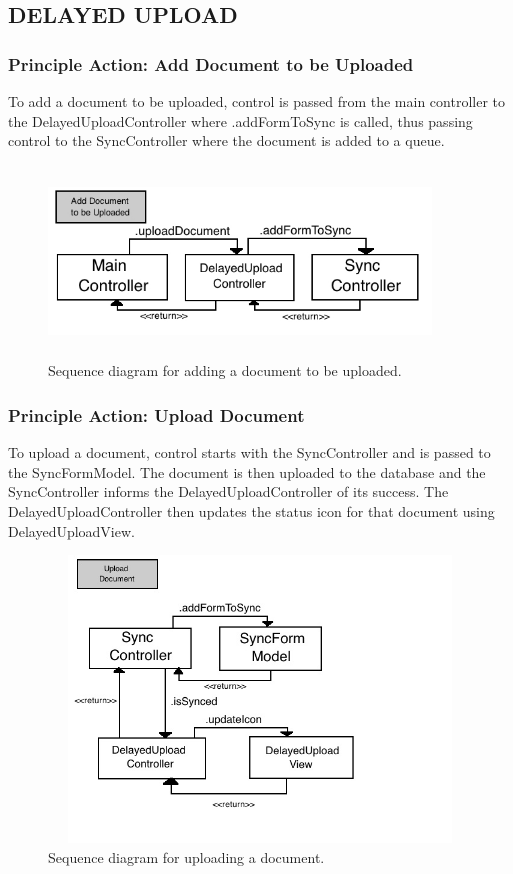 \documentclass[twoside,letterpaper]{article}
\begin{document}
{\subsection[DELAYED UPLOAD]{\rmfamily\bfseries\color{black}
DELAYED UPLOAD}
\subsubsection{Principle Action: Add Document to be Uploaded}
To add a document to be uploaded, control is passed from the main controller to the DelayedUploadController where .addFormToSync is called, thus passing control to the SyncController where the document is added to a queue.
\begin{figure}[H]
\centering
\includegraphics[width=4in,height=2in]{Add.jpg}
\caption{Sequence diagram for adding a document to be uploaded.}
\end{figure}
\subsubsection{Principle Action: Upload Document}
To upload a document, control starts with the SyncController and is passed to the SyncFormModel. The document is then uploaded to the database and the SyncController informs the DelayedUploadController of its success. The DelayedUploadController then updates the status icon for that document using DelayedUploadView.
\begin{figure}[H]
\centering
\includegraphics[width=5in,height=3in]{Upload.jpg}
\caption{Sequence diagram for uploading a document.}
\end{figure}


}
\end{document}
